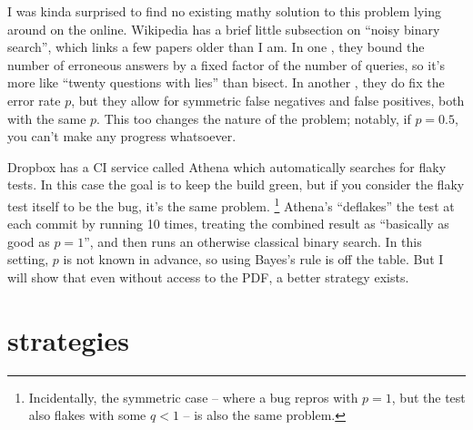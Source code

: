 \documentclass[11pt]{sigplanconf}
\begin{document}
I was kinda surprised to find no existing mathy solution to this problem lying around on the online.
Wikipedia has a brief little subsection on ``noisy binary search'', which links a few papers older than I am.
In one \cite{noisy2}, they bound the number of erroneous answers by a fixed factor of the number of queries,
so it's more like ``twenty questions with lies'' than bisect.
In another \cite{noisy1}, they do fix the error rate $p$,
but they allow for symmetric false negatives and false positives, both with the same $p$.
This too changes the nature of the problem;
notably, if $p=0.5$, you can't make any progress whatsoever.

Dropbox has a CI service called Athena \cite{athena}
which automatically searches for flaky tests. %
In this case the goal is to keep the build green,
but if you consider the flaky test itself to be the bug, it's the same problem.%
\footnote{Incidentally, the symmetric case
-- where a bug repros with $p=1$, but the test also flakes with some $q<1$ --
is also the same problem.}
Athena's ``deflakes'' the test at each commit by running 10 times,
treating the combined result as ``basically as good as $p=1$'',
and then runs an otherwise classical binary search.
In this setting, $p$ is not known in advance, so using Bayes's rule is off the table.
But I will show that even without access to the PDF, a better strategy exists. %


\section{strategies}
\label{sec:strats}
\end{document}
